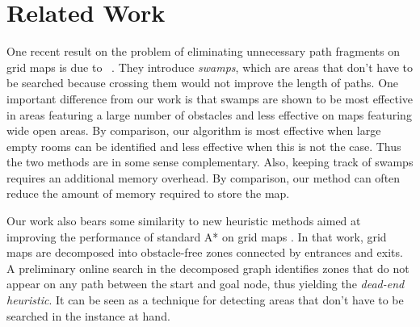\section{Related Work}
One recent result on the problem of eliminating unnecessary path fragments on grid maps is due to
\citeauthor{pochter09}~.
They introduce \emph{swamps}, which are areas that don't have to be searched
because crossing them would not improve the length of paths.
One important difference from our work is that swamps are shown to be most effective in areas featuring a
large number of obstacles and less effective on maps featuring wide open areas.
By comparison, our algorithm is most effective when large empty rooms can be identified and less
effective when this is not the case.
Thus the two methods are in some sense complementary.
Also, keeping track of swamps requires an additional memory overhead.
By comparison, our method can often reduce the amount of
memory required to store the map.
\par
Our work also bears some similarity to new heuristic methods aimed at improving the 
performance of standard A* on grid maps \cite{bjornsson06}.
In that work, grid maps are decomposed into obstacle-free zones connected by entrances 
and exits.
A preliminary online search in the decomposed graph identifies zones that do not appear 
on any path between the start and goal node, thus yielding the \emph{dead-end heuristic}.
It can be seen as a technique for detecting areas that don't have to be searched
in the instance at hand.
